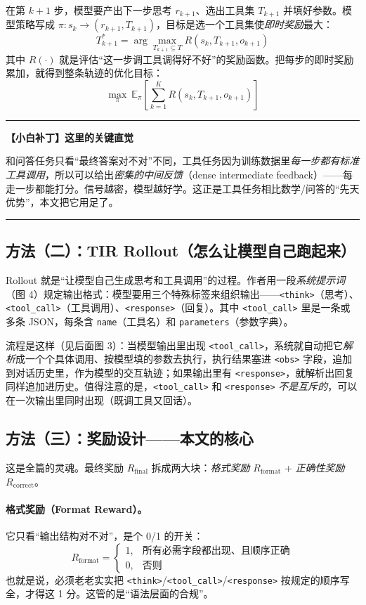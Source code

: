 \documentclass[11pt,UTF8,fontset=fandol]{ctexart}
\newenvironment{tip}[1]{%
  \par\smallskip\noindent\rule{\linewidth}{0.4pt}\par\nobreak
  \noindent\textbf{【小白补丁】#1}\par\nobreak\noindent\ignorespaces
}{%
  \par\noindent\rule{\linewidth}{0.4pt}\par\smallskip
}
\begin{document}
在第 $k+1$ 步，模型要产出下一步思考 $r_{k+1}$、选出工具集 $T_{k+1}$ 并填好参数。模型策略写成 $\pi: s_k \to (r_{k+1}, T_{k+1})$，目标是选一个工具集使\emph{即时奖励}最大：
\[
T_{k+1}^{*} = \arg\max_{T_{k+1}\subseteq T} R(s_k, T_{k+1}, o_{k+1})
\]
其中 $R(\cdot)$ 就是评估“这一步调工具调得好不好”的奖励函数。把每步的即时奖励累加，就得到整条轨迹的优化目标：
\[
\max_{\pi}\ \mathbb{E}_{\pi}\left[\sum_{k=1}^{K} R(s_k, T_{k+1}, o_{k+1})\right]
\]

\begin{tip}{这里的关键直觉}
和问答任务只看“最终答案对不对”不同，工具任务因为训练数据里\emph{每一步都有标准工具调用}，所以可以给出\emph{密集的中间反馈}（dense intermediate feedback）——每走一步都能打分。信号越密，模型越好学。这正是工具任务相比数学/问答的“先天优势”，本文把它用足了。
\end{tip}

\subsection{方法（二）：TIR Rollout（怎么让模型自己跑起来）}

Rollout 就是“让模型自己生成思考和工具调用”的过程。作者用一段\emph{系统提示词}（图 4）规定输出格式：模型要用三个特殊标签来组织输出——\texttt{<think>}（思考）、\texttt{<tool\_call>}（工具调用）、\texttt{<response>}（回复）。其中 \texttt{<tool\_call>} 里是一条或多条 JSON，每条含 \texttt{name}（工具名）和 \texttt{parameters}（参数字典）。

流程是这样（见后面图 3）：当模型输出里出现 \texttt{<tool\_call>}，系统就自动把它\emph{解析}成一个个具体调用、按模型填的参数去执行，执行结果塞进 \texttt{<obs>} 字段，追加到对话历史里，作为模型的交互轨迹；如果输出里有 \texttt{<response>}，就解析出回复同样追加进历史。值得注意的是，\texttt{<tool\_call>} 和 \texttt{<response>} \emph{不是互斥的}，可以在一次输出里同时出现（既调工具又回话）。

\subsection{方法（三）：奖励设计——本文的核心}

这是全篇的灵魂。最终奖励 $R_{\text{final}}$ 拆成两大块：\emph{格式奖励} $R_{\text{format}}$ + \emph{正确性奖励} $R_{\text{correct}}$。

\paragraph{格式奖励（Format Reward）。}它只看“输出结构对不对”，是个 0/1 的开关：
\[
R_{\text{format}}=\begin{cases}1, & \text{所有必需字段都出现、且顺序正确}\\ 0, & \text{否则}\end{cases}
\]
也就是说，必须老老实实把 \texttt{<think>}/\texttt{<tool\_call>}/\texttt{<response>} 按规定的顺序写全，才得这 1 分。这管的是“语法层面的合规”。
\end{document}
